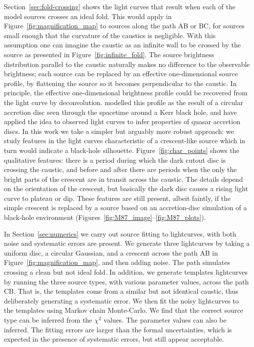 \documentclass[usenatbib]{mn2e}
\begin{document}
Section~\ref{sec:fold-crossing} shows the light curves that result
when each of the model sources crosses an ideal fold.  This would
apply in Figure~\ref{fig:magnification_map} to sources along the path
AB or BC, for sources small enough that the curvature of the caustics
is negligible.  With this assumption one can imagine the caustic as an
infinite wall to be crossed by the source as presented in
Figure~\ref{fig:infinite_fold}.  The source brightness distribution
parallel to the caustic naturally makes no difference to the
observable brightness; each source can be replaced by an effective
one-dimensional source profile, by flattening the source so it becomes
perpendicular to the caustic.  In principle, the effective
one-dimensional brightness profile could be recovered from the light
curve by deconvolution.  \cite{1999ApJ...524...49A} modelled this
profile as the result of a circular accretion disc seen through the
spacetime around a Kerr black hole, and \cite{2012MNRAS.423..676A}
have applied the idea to observed light curves to infer properties of
quasar accretion discs.  In this work we take a simpler but arguably
more robust approach: we study features in the light curves
characteristic of a crescent-like source which in turn would indicate
a black-hole silhouette.  Figure~\ref{fig:char_points} shows the
qualitative features: there is a period during which the dark cutout
disc is crossing the caustic, and before and after there are periods
when the only the bright parts of the crescent are in transit across
the caustic.  The details depend on the orientation of the crescent,
but basically the dark disc causes a rising light curve to plateau or
dip.  These features are still present, albeit faintly, if the simple
crescent is replaced by a source based on an accretion-disc simulation
of a black-hole environment
(Figures~\ref{fig:M87_image}--\ref{fig:M87_plots}).


In Section~\ref{sec:numerics} we carry out source fitting to
lightcurves, with both noise and systematic errors are present.  We
generate three lightcurves by taking a uniform disc, a circular
Gaussian, and a crescent across the path AB in
Figure~\ref{fig:magnification_map}, and then adding noise.  The path
simulates crossing a clean but not ideal fold.  In addition, we
generate templates lightcurves by running the three source types, with
various parameter values, across the path CB.  That is, the templates
come from a similar but not identical caustic, thus deliberately
generating a systematic error.  We then fit the noisy lightcurves to
the templates using Markov chain Monte-Carlo.  We find that the
correct source type can be inferred from the $\chi^2$ values.  The
parameter values can also be inferred. The fitting errors are larger
than the formal uncertainties, which is expected in the presence of
systematic errors, but still appear acceptable.
\end{document}
